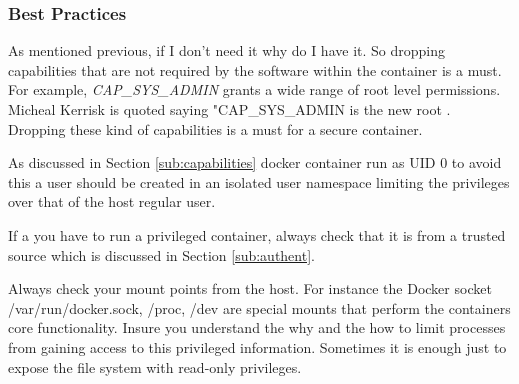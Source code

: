 \subsubsection{Best Practices}
As mentioned previous, if I don't need it why do I have it. So dropping capabilities that are not required by the software within the container is a must. For example, \textit{CAP\_SYS\_ADMIN} grants a wide range of root level permissions. Micheal Kerrisk is quoted saying "CAP\_SYS\_ADMIN is the new root \citep{kerrisk_2012}. Dropping these kind of capabilities is a must for a secure container.

As discussed in Section \ref{sub:capabilities} docker container run as UID 0 to avoid this a user should be created in an isolated user namespace limiting the privileges over that of the host regular user.

If a you have to run a privileged container, always check that it is from a trusted source which is discussed in Section \ref{sub:authent}.

Always check your mount points from the host. For instance the Docker socket /var/run/docker.sock, /proc, /dev are special mounts that perform the containers core functionality. Insure you understand the why and the how to limit processes from gaining access to this privileged information. Sometimes it is enough just to expose the file system with read-only privileges. 
